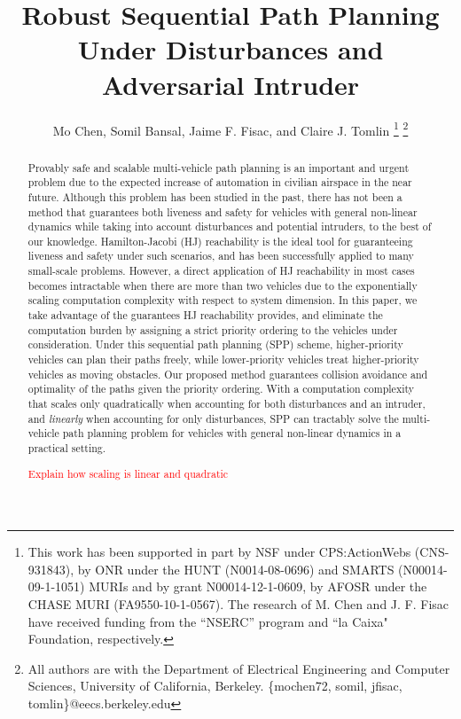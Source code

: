 \documentclass[12pt, draftcls, onecolumn]{IEEEtran}
\title{\LARGE \bf Robust Sequential Path Planning Under Disturbances and Adversarial Intruder}
\author{Mo Chen, Somil Bansal, Jaime F. Fisac, and Claire J. Tomlin
\thanks{This work has been supported in part by NSF under CPS:ActionWebs (CNS-931843), by ONR under the HUNT (N0014-08-0696) and SMARTS (N00014-09-1-1051) MURIs and by grant N00014-12-1-0609, by AFOSR under the CHASE MURI (FA9550-10-1-0567). The research of M. Chen and J. F. Fisac have received funding from the ``NSERC'' program and ``la Caixa" Foundation, respectively.}
\thanks{All authors are with the Department of Electrical Engineering and Computer Sciences, University of California, Berkeley. \{mochen72, somil, jfisac, tomlin\}@eecs.berkeley.edu}
}
\newcommand{\MCnote}{\textcolor{red}}
\begin{document}
\maketitle
\thispagestyle{empty}
\pagestyle{empty}

\begin{abstract}
Provably safe and scalable multi-vehicle path planning is an important and urgent problem due to the expected increase of automation in civilian airspace in the near future. Although this problem has been studied in the past, there has not been a method that guarantees both liveness and safety for vehicles with general non-linear dynamics while taking into account disturbances and potential intruders, to the best of our knowledge. Hamilton-Jacobi (HJ) reachability is the ideal tool for guaranteeing liveness and safety under such scenarios, and has been successfully applied to many small-scale problems. However, a direct application of HJ reachability in most cases becomes intractable when there are more than two vehicles due to the exponentially scaling computation complexity with respect to system dimension. In this paper, we take advantage of the guarantees HJ reachability provides, and eliminate the computation burden by assigning a strict priority ordering to the vehicles under consideration. Under this sequential path planning (SPP) scheme, higher-priority vehicles can plan their paths freely, while lower-priority vehicles treat higher-priority vehicles as moving obstacles. Our proposed method guarantees collision avoidance and optimality of the paths given the priority ordering. With a computation complexity that scales only quadratically when accounting for both disturbances and an intruder, and \textit{linearly} when accounting for only disturbances, SPP can tractably solve the multi-vehicle path planning problem for vehicles with general non-linear dynamics in a practical setting. 

\MCnote{Explain how scaling is linear and quadratic}
\end{abstract}















\end{document}
